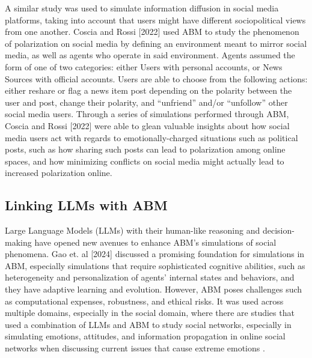 A similar study \cite{Coscia-2022} was used to simulate information diffusion in social media platforms, taking into account that users might have different sociopolitical views from one another. Coscia and Rossi [2022] used ABM to study the phenomenon of polarization on social media by defining an environment meant to mirror social media, as well as agents who operate in said environment. Agents assumed the form of one of two categories: either Users with personal accounts, or News Sources with official accounts. Users are able to choose from the following actions: either reshare or flag a news item post depending on the polarity between the user and post, change their polarity, and “unfriend” and/or “unfollow” other social media users. Through a series of simulations performed through ABM, Coscia and Rossi [2022] were able to glean valuable insights about how social media users act with regards to emotionally-charged situations such as political posts, such as how sharing such posts can lead to polarization among online spaces, and how minimizing conflicts on social media might actually lead to increased polarization online.

\subsection{Linking LLMs with ABM}
Large Language Models (LLMs) with their human-like reasoning and decision-making have opened new avenues to enhance ABM’s simulations of social phenomena. Gao et. al [2024] discussed a promising foundation for simulations in ABM, especially simulations that require sophisticated cognitive abilities, such as heterogeneity and personalization of agents’ internal states and behaviors, and they have adaptive learning and evolution. However, ABM poses challenges such as computational expenses, robustness, and ethical risks. It was used across multiple domains, especially in the social domain, where there are studies that used a combination of LLMs and ABM to study social networks, especially in simulating emotions, attitudes, and information propagation in online social networks when discussing current issues that cause extreme emotions \cite{Gao-2024}.

